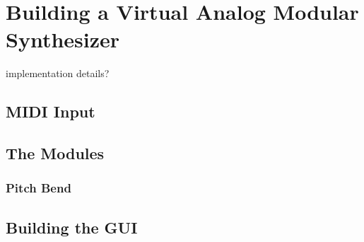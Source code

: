 \chapter[Modular Synthesizer]{Building a Virtual Analog Modular Synthesizer}\label{chapter:building-a-mod-synth}

implementation details?


\section{MIDI Input}\label{section:midi-input}

\section{The Modules}\label{section:the-modules}

\subsection{Pitch Bend}

\section{Building the GUI}\label{section:building-the-gui}